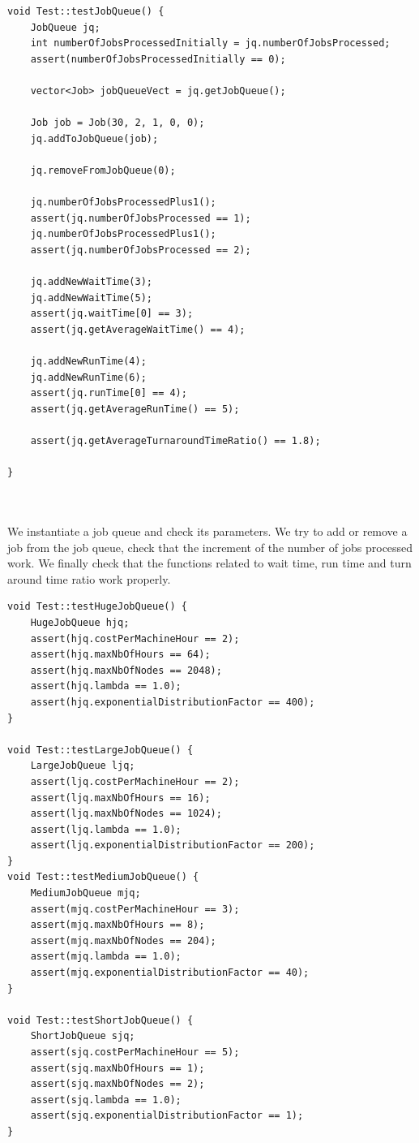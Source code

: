 \documentclass [10 pt, a4 paper]{report}
\begin{document}
\begin{lstlisting}[caption=testJobQueue function of the class Test, label={lst:code1}, frame=single]
void Test::testJobQueue() {
	JobQueue jq;
	int numberOfJobsProcessedInitially = jq.numberOfJobsProcessed;
	assert(numberOfJobsProcessedInitially == 0);

	vector<Job> jobQueueVect = jq.getJobQueue();
	
	Job job = Job(30, 2, 1, 0, 0);
	jq.addToJobQueue(job);

	jq.removeFromJobQueue(0);

	jq.numberOfJobsProcessedPlus1();
	assert(jq.numberOfJobsProcessed == 1);
	jq.numberOfJobsProcessedPlus1();
	assert(jq.numberOfJobsProcessed == 2);

	jq.addNewWaitTime(3);
	jq.addNewWaitTime(5);
	assert(jq.waitTime[0] == 3);
	assert(jq.getAverageWaitTime() == 4);

	jq.addNewRunTime(4);
	jq.addNewRunTime(6);
	assert(jq.runTime[0] == 4);
	assert(jq.getAverageRunTime() == 5);

	assert(jq.getAverageTurnaroundTimeRatio() == 1.8);

}
\end{lstlisting}

\noindent
\\ \\ 
We instantiate a job queue and check its parameters. We try to add or remove a job from the job queue, check that the increment of the number of jobs processed work. We finally check that the functions related to wait time, run time and turn around time ratio work properly.


\begin{lstlisting}[caption=test of the other jobQueue functions of the class Test, label={lst:code1}, frame=single]
void Test::testHugeJobQueue() {
	HugeJobQueue hjq;
	assert(hjq.costPerMachineHour == 2);
	assert(hjq.maxNbOfHours == 64);
	assert(hjq.maxNbOfNodes == 2048);
	assert(hjq.lambda == 1.0);
	assert(hjq.exponentialDistributionFactor == 400);
}

void Test::testLargeJobQueue() {
	LargeJobQueue ljq;
	assert(ljq.costPerMachineHour == 2);
	assert(ljq.maxNbOfHours == 16);
	assert(ljq.maxNbOfNodes == 1024);
	assert(ljq.lambda == 1.0);
	assert(ljq.exponentialDistributionFactor == 200);
}
void Test::testMediumJobQueue() {
	MediumJobQueue mjq;
	assert(mjq.costPerMachineHour == 3);
	assert(mjq.maxNbOfHours == 8);
	assert(mjq.maxNbOfNodes == 204);
	assert(mjq.lambda == 1.0);
	assert(mjq.exponentialDistributionFactor == 40);
}

void Test::testShortJobQueue() {
	ShortJobQueue sjq;
	assert(sjq.costPerMachineHour == 5);
	assert(sjq.maxNbOfHours == 1);
	assert(sjq.maxNbOfNodes == 2);
	assert(sjq.lambda == 1.0);
	assert(sjq.exponentialDistributionFactor == 1);
}
\end{lstlisting}
\end{document}
